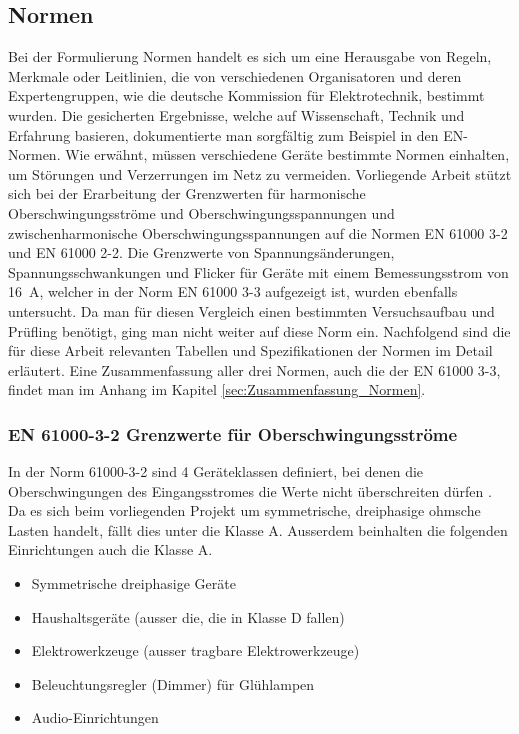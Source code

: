 \subsection{Normen}\label{sec:Normen}

Bei der Formulierung \grqq Normen\grqq \hspace{0.02cm} handelt es sich um eine Herausgabe von Regeln, Merkmale oder Leitlinien, die von verschiedenen Organisatoren und deren Expertengruppen, wie die deutsche Kommission für Elektrotechnik, bestimmt wurden. Die gesicherten Ergebnisse, welche auf Wissenschaft, Technik und Erfahrung basieren, dokumentierte man sorgfältig zum Beispiel in den EN-Normen. Wie erwähnt, müssen verschiedene Geräte bestimmte Normen einhalten, um Störungen und Verzerrungen im Netz zu vermeiden. Vorliegende Arbeit stützt sich bei der Erarbeitung der Grenzwerten für harmonische Oberschwingungsströme und Oberschwingungsspannungen und zwischenharmonische Oberschwingungsspannungen auf die Normen EN 61000 3-2 und EN 61000 2-2. Die Grenzwerte von Spannungsänderungen, Spannungsschwankungen und Flicker für Geräte mit einem Bemessungsstrom von \SI{16}{A}, welcher in der Norm EN 61000 3-3 aufgezeigt ist, wurden ebenfalls untersucht. Da man für diesen Vergleich einen bestimmten Versuchsaufbau und Prüfling benötigt, ging man nicht weiter auf diese Norm ein. Nachfolgend sind die für diese Arbeit relevanten Tabellen und Spezifikationen der Normen im Detail erläutert. Eine Zusammenfassung aller drei Normen, auch die der EN 61000 3-3, findet man im Anhang im Kapitel \ref{sec:Zusammenfassung_Normen}.


\subsubsection{EN 61000-3-2 Grenzwerte für Oberschwingungsströme}\label{sec:Stromnormen}

In der Norm 61000-3-2 sind 4 Geräteklassen definiert, bei denen die Oberschwingungen des Eingangsstromes die Werte nicht überschreiten dürfen \cite{EMVNorm}. Da es sich beim vorliegenden Projekt um symmetrische, dreiphasige ohmsche Lasten handelt, fällt dies unter die Klasse A. Ausserdem beinhalten die folgenden Einrichtungen auch die Klasse A. 
\begin{itemize}
\item Symmetrische dreiphasige Geräte	
\item Haushaltsgeräte (ausser die, die in Klasse D fallen)
\item Elektrowerkzeuge (ausser tragbare Elektrowerkzeuge)
\item Beleuchtungsregler (Dimmer) für Glühlampen
\item Audio-Einrichtungen
\end{itemize} 

